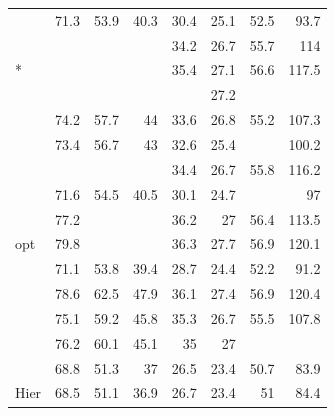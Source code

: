 \begin{table}[ht]
\begin{tabular}{lcrrrrrr}
    \citet{Ren2017}	&	71.3	&	53.9	&	40.3	&	30.4	&	25.1	&	52.5	&	93.7	\\
    \citet{Rennie2017} 	&		&		&		&	34.2	&	26.7	&	55.7	&	114	\\
    \citet{Rennie2017}*	&		&		&		&	35.4	&	27.1	&	56.6	&	117.5	\\
    \citet{Shetty2017}	&		&		&		&		&	27.2	&		&		\\
    \citet{Wang2017}	&	74.2	&	57.7	&	44	&	33.6	&	26.8	&	55.2	&	107.3	\\
    \citet{Yao2017_Attr}	&	73.4	&	56.7	&	43	&	32.6	&	25.4	&		&	100.2	\\
    \citet{Zhang2017}	&		&		&		&	34.4	&	26.7	&	55.8	&	116.2	\\
    \citet{Zhou2017}	&	71.6	&	54.5	&	40.5	&	30.1	&	24.7	&		&	97	\\
    \citet{Anderson2018_BUTD}	&	77.2	&		&		&	36.2	&	27	&	56.4	&	113.5	\\
    \citet{Anderson2018_BUTD}  opt	&	79.8	&		&		&	36.3	&	27.7	&	56.9	&	120.1	\\
    \citet{Aneja2018}	&	71.1	&	53.8	&	39.4	&	28.7	&	24.4	&	52.2	&	91.2	\\
    \citet{Gu2018}	&	78.6	&	62.5	&	47.9	&	36.1	&	27.4	&	56.9	&	120.4	\\
    \citet{Jiang2018}	&	75.1	&	59.2	&	45.8	&	35.3	&	26.7	&	55.5	&	107.8	\\
    \citet{Khademi2018}	&	76.2	&	60.1	&	45.1	&	35	&	27	&		&		\\
    \citet{Wang2018}	&	68.8	&	51.3	&	37	&	26.5	&	23.4	&	50.7	&	83.9	\\
    \citet{Wang2018} Hier	&	68.5	&	51.1	&	36.9	&	26.7	&	23.4	&	51	&	84.4	\\
    \bottomrule
\end{tabular}
\label{tab:benchmarks_mscoco}
\end{table}



